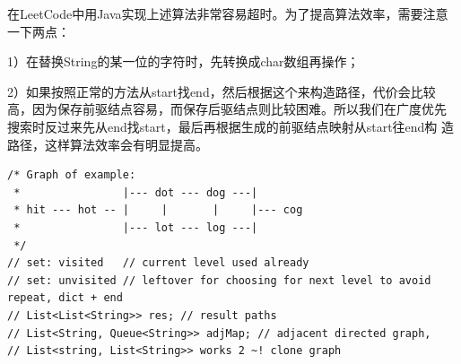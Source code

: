 \documentclass[12pt]{book}
\begin{document}
在LeetCode中用Java实现上述算法非常容易超时。为了提高算法效率，需要注意一下两点：

1）在替换String的某一位的字符时，先转换成char数组再操作；

2）如果按照正常的方法从start找end，然后根据这个来构造路径，代价会比较
高，因为保存前驱结点容易，而保存后驱结点则比较困难。所以我们在广度优先
搜索时反过来先从end找start，最后再根据生成的前驱结点映射从start往end构
造路径，这样算法效率会有明显提高。

\lstset{language=java,label= ,caption= ,numbers=none}
\begin{lstlisting}
/* Graph of example:
 *                |--- dot --- dog ---|
 * hit --- hot -- |     |       |     |--- cog
 *                |--- lot --- log ---|
 */
// set: visited   // current level used already
// set: unvisited // leftover for choosing for next level to avoid repeat, dict + end
// List<List<String>> res; // result paths
// List<String, Queue<String>> adjMap; // adjacent directed graph, 
// List<string, List<String>> works 2 ~! clone graph
\end{lstlisting}
\end{document}
